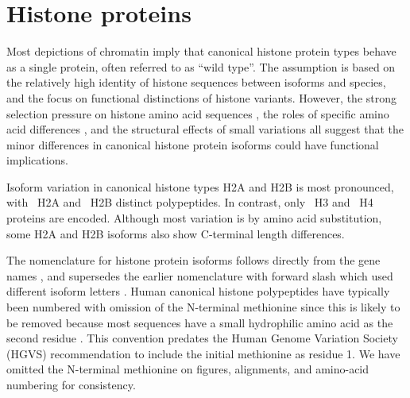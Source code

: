\section{Histone proteins}
  Most depictions of chromatin imply that
  canonical histone protein types behave as a single protein,
  often referred to as ``wild type''.
  The assumption is based on the relatively high identity of histone sequences
  between isoforms and species,
  and the focus on functional distinctions of histone variants.
  However, the strong selection pressure on histone amino acid
  sequences \citep{birth-death-review},
  the roles of specific amino acid differences \citep{MazeAllis2014},
  and the structural effects of small variations \citep{KurumizakaCOSB2013}
  all suggest that the minor differences in canonical histone protein isoforms
  could have functional implications.

  Isoform variation in canonical histone types H2A and H2B is most pronounced,
  with \HTwoAUniqueProteins{}~H2A and \HTwoBUniqueProteins{}~H2B distinct polypeptides.
  In contrast, only \HThreeUniqueProteins{}~H3 and \HFourUniqueProteins{}~H4 proteins
  are encoded. Although most variation is by amino acid substitution,
  some H2A and H2B isoforms also show C-terminal length differences.

  The nomenclature for histone protein isoforms follows directly
  from the gene names \citep{Marzluff02},
  and supersedes the earlier nomenclature with forward slash which used different isoform letters
  \citep{AlbigGenomics1997,AlbigHumangen1997}.
  Human canonical histone polypeptides have typically been numbered
  with omission of the N-terminal methionine
  since this is likely to be removed because most sequences have
  a small hydrophilic amino acid as the second residue \citep{XiaoPeiBiochem2010}.
  This convention predates the Human Genome Variation Society (HGVS) recommendation
  to include the initial methionine as residue 1.
  We have omitted the N-terminal methionine on figures, alignments,
  and amino-acid numbering for consistency.



